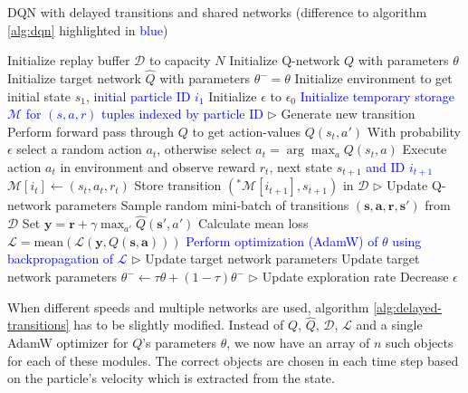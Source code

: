 \begin{algorithm}[h]
    \caption{DQN with delayed transitions and shared networks (difference to algorithm \ref{alg:dqn} highlighted in \textcolor{blue}{blue})}
    \label{alg:delayed-transitions}
    \begin{algorithmic}
        \State Initialize replay buffer $\mathcal{D}$ to capacity $N$
        \State Initialize Q-network $Q$ with parameters $\theta$
        \State Initialize target network $\hat{Q}$ with parameters $\theta^-=\theta$
        \State Initialize environment to get initial state $s_1$, \textcolor{blue}{initial particle ID $i_1$}
        \State Initialize $\epsilon$ to $\epsilon_0$
        \State \textcolor{blue}{Initialize temporary storage $\mathcal{M}$ for $(s,a,r)$ tuples indexed by particle ID}
            \State $\triangleright$ Generate new transition
            \State Perform forward pass through $Q$ to get action-values $Q(s_t, a')$ 
            \State With probability $\epsilon$ select a random action $a_t$, otherwise select $a_t = \arg\!\max_a Q(s_t, a)$
            \State Execute action $a_t$ in environment and observe reward $r_t$, next state $s_{t+1}$ \textcolor{blue}{and ID $i_{t+1}$}
            \color{blue}
            \State $\mathcal{M}[i_t] \gets (s_t, a_t, r_t)$ 
                \State Store transition $(^*\mathcal{M}[i_{t+1}], s_{t+1})$ in $\mathcal{D}$
            \EndIf
            \normalcolor
            \State $\triangleright$ Update Q-network parameters
            \State Sample random mini-batch of transitions $(\bm{s}, \bm{a}, \bm{r}, \bm{s'})$ from $\mathcal{D}$
            \State Set $\bm{y} = \bm{r} + \gamma \max_{a'} \hat{Q}(\bm{s'}, a')$
            \State Calculate mean loss $\mathcal{L} = \text{mean}(\mathcal{L}(\bm{y}, Q(\bm{s}, \bm{a})))$
            \State \textcolor{blue}{Perform optimization (AdamW) of $\theta$ using backpropagation of $\mathcal{L}$}
            \State $\triangleright$ Update target network parameters
            \State Update target network parameters $\theta^- \gets \tau \theta + (1 - \tau) \theta^-$
            \State $\triangleright$ Update exploration rate
            \State Decrease $\epsilon$   
        \EndFor
    \end{algorithmic}
\end{algorithm}
When different speeds and multiple networks are used, algorithm \ref{alg:delayed-transitions} has to be slightly modified. Instead of $Q$, $\hat{Q}$, $\mathcal{D}$, $\mathcal{L}$ and a single AdamW optimizer for $Q$'s parameters $\theta$, we now have an array of $n$ such objects for each of these modules. The correct objects are chosen in each time step based on the particle's velocity which is extracted from the state. 

